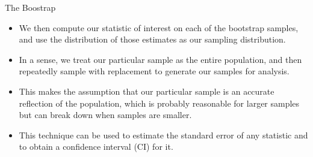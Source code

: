 \documentclass[handout]{beamer}
\begin{document}
\begin{frame}{The Boostrap}
\scriptsize{

\begin{itemize}

\item We then compute our statistic of interest on each of the bootstrap samples, and use the distribution of those estimates as our sampling distribution. 



\item In a sense, we treat our particular sample as the entire population, and then repeatedly sample with replacement to generate our samples for analysis.
\item This makes the assumption that our particular sample is an accurate reflection of the population, which is probably reasonable for larger samples but can break down when samples are smaller.

\item This technique can be used to estimate the standard error of any statistic and to obtain a confidence interval (CI) for it. 



\end{itemize}
}
 
\end{frame}
\end{document}
